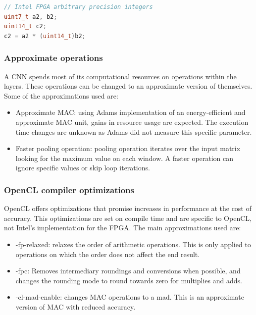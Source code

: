\begin{enumerate}
\begin{lstlisting}[language=C++, caption=Arbitrary precision integers, yielding
a 14 bit result, label=code:arbitrary]
// Intel FPGA arbitrary precision integers
uint7_t a2, b2;
uint14_t c2;
c2 = a2 * (uint14_t)b2;
\end{lstlisting}

\subsubsection{Approximate operations}

A CNN spends most of its computational resources on operations within the layers. These operations
can be changed to an approximate version of themselves. Some of the approximations used are:

\begin{itemize}
    \item Approximate MAC: using Adams \cite{adams2019energy} implementation of an energy-efficient
    and approximate MAC unit, gains in resource usage are expected. The execution time changes
    are unknown as Adams did not measure this specific parameter.
    \item Faster pooling operation: pooling operation iterates over the input matrix
    looking for the maximum value on each window. A faster operation can ignore specific
    values or skip loop iterations.
\end{itemize}

\subsubsection{OpenCL compiler optimizations}

OpenCL offers optimizations that promise increases in performance at the cost of accuracy.
This optimizations are set on compile time and are specific to OpenCL, not Intel's implementation
for the FPGA. The main approximations used are:

\begin{itemize}
    \item -fp-relaxed: relaxes the order of arithmetic operations. This is only applied 
    to operations on which the order does not affect the end result.
    \item -fpc: Removes intermediary roundings and conversions when possible, 
    and changes the rounding mode to round towards zero for 
    multiplies and adds.
    \item -cl-mad-enable: changes MAC operations to a mad. This is an approximate version of
    MAC with reduced accuracy.
\end{itemize}


\end{enumerate}
